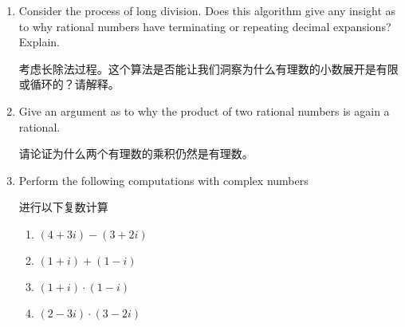 \begin{enumerate}
  \vfill
  
  \workbookpagebreak
   
  \item Consider the process of long division.
  Does this algorithm give
  any insight as to why rational numbers have terminating or repeating
  decimal expansions?  Explain.
  
  考虑长除法过程。这个算法是否能让我们洞察为什么有理数的小数展开是有限或循环的？请解释。
  
  
  \vfill
  
  \item Give an argument as to why the product of two rational numbers
  is again a rational.
  
  请论证为什么两个有理数的乘积仍然是有理数。
  
  
  \vfill
  
  \textbookpagebreak
  
  \hintspagebreak
  
  \item Perform the following computations with complex numbers
  
    进行以下复数计算
  
    \begin{enumerate}
    \item \rule{0pt}{20pt}$ (4 + 3i) - (3 + 2i) $
    \item \rule{0pt}{20pt}$ (1 + i) + (1 - i) $
    \item \rule{0pt}{20pt}$ (1 + i) \cdot (1 - i) $
    \item \rule{0pt}{20pt}$ (2 - 3i) \cdot (3 - 2i) $
    \end{enumerate}
  

\end{enumerate}
